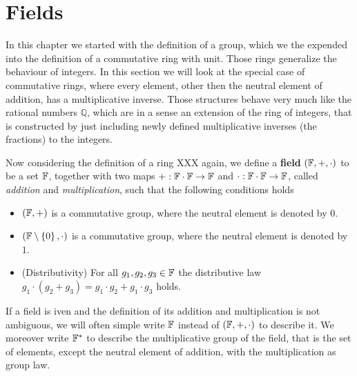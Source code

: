 \section{Fields}
In this chapter we started with the definition of a group, which we the expended into the definition of a commutative ring with unit. Those rings generalize the behaviour of integers. In this section we will look at the special case of commutative rings, where every element, other then the neutral element of addition, has a multiplicative inverse. Those structures behave very much like the rational numbers $\mathbb{Q}$, which are in a sense an extension of the ring of integers, that is constructed by just including newly defined multiplicative inverses (the fractions) to the integers. 

Now considering the definition of a ring XXX again, we define a \textbf{field} $ (\mathbb{F}, +, \cdot) $ to be a set $ \mathbb{F}$, together with two maps $ +: \mathbb{F} \cdot \mathbb{F} \to \mathbb{F} $ and $ \cdot: \mathbb{F} \cdot \mathbb{F} \to \mathbb{F} $, called \textit{addition} and \textit{multiplication}, such that the following conditions holds
\begin{itemize}
\item $ \left (\mathbb{F}, + \right) $ is a commutative group, where the neutral element is denoted by $ 0 $.
\item $ \left (\mathbb{F} \setminus \left \{0 \right \}, \cdot \right) $ is a commutative group, where the neutral element is denoted by $ 1 $.
\item (Distributivity) For all $ g_1, g_2, g_3 \in \mathbb{F} $ the distributive law
$g_1 \cdot \left (g_2 + g_3 \right) = g_1 \cdot g_2 + g_1 \cdot g_3$ holds.
\end{itemize}
If a field is iven and the definition of its addition and multiplication is not ambiguous, we will often simple write $\mathbb{F}$ instead of $(\mathbb{F},+,\cdot)$ to describe it. We moreover write $\mathbb{F}^*$ to describe the multiplicative group of the field, that is the set of elements, except the neutral element of addition, with the multiplication as group law.

